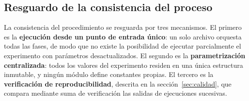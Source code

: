 \subsection{Resguardo de la consistencia del proceso}

La consistencia del procedimiento se resguarda por tres mecanismos. El primero
es la \textbf{ejecución desde un punto de entrada único}: un solo archivo
orquesta todas las fases, de modo que no existe la posibilidad de ejecutar
parcialmente el experimento con parámetros desactualizados. El segundo es la
\textbf{parametrización centralizada}: todos los valores del experimento residen
en una única estructura inmutable, y ningún módulo define constantes propias. El
tercero es la \textbf{verificación de reproducibilidad}, descrita en la
sección~\ref{sec:calidad}, que compara mediante suma de verificación las salidas
de ejecuciones sucesivas.
